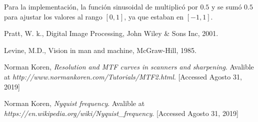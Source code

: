 \documentclass[conference]{IEEEtran}
\begin{document}
Para la implementación, la función sinusoidal de multiplicó por $0.5$ y se sumó $0.5$ para ajustar los valores al rango  $[0,1]$, ya que estaban en $[-1,1]$.


\begin{thebibliography}{00}
 Pratt, W. k., Digital Image Processing, John Wiley \& Sons Inc, 2001.

 Levine, M.D., Vision in man and machine, McGraw-Hill, 1985.

 Norman Koren, \textit{Resolution and MTF curves in scanners and sharpening}. Avalible at \textit{http://www.normankoren.com/Tutorials/MTF2.html}. [Accessed Agosto 31, 2019]

 Norman Koren, \textit{Nyquist frequency}. Avalible at \textit{https://en.wikipedia.org/wiki/Nyquist\_frequency}. [Accessed Agosto 31, 2019]
\end{thebibliography}







\end{document}

